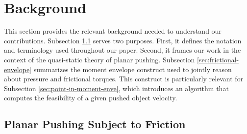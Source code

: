 \documentclass[conference]{IEEEtran}
\newcommand{\BB}[1]{{\color{red} {Byron: {#1}}}}
\begin{document}



\section{Background}\label{sec:background}
This section provides the relevant background needed to understand our
contributions. Subsection \ref{sec:plan-push-subj} serves two
purposes. First, it defines the notation and terminology used
throughout our paper. Second, it frames our work in the context of the
quasi-static theory of planar pushing. Subsection
\ref{sec:frictional-envelope} summarizes the moment envelope construct
used to jointly reason about pressure and frictional torques. This
construct is particularly relevant for Subsection
\ref{sec:point-in-moment-enve}, which introduces an algorithm that
computes the feasibility of a given pushed object velocity.




\subsection{Planar Pushing Subject to Friction}\label{sec:plan-push-subj}
\end{document}
